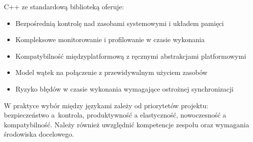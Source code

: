 C++ ze standardową biblioteką oferuje:
\begin{itemize}
    \item Bezpośrednią kontrolę nad zasobami systemowymi i układem pamięci
    \item Kompleksowe monitorowanie i profilowanie w czasie wykonania  
    \item Kompatybilność międzyplatformową z ręcznymi abstrakcjami platformowymi
    \item Model wątek na połączenie z przewidywalnym użyciem zasobów
    \item Ryzyko błędów w czasie wykonania wymagające ostrożnej synchronizacji
\end{itemize}

W praktyce wybór między językami zależy od priorytetów projektu: bezpieczeństwo a~kontrola, produktywność a elastyczność, nowoczesność a kompatybilność. Należy również uwzględnić kompetencje zespołu oraz wymagania środowiska docelowego.


